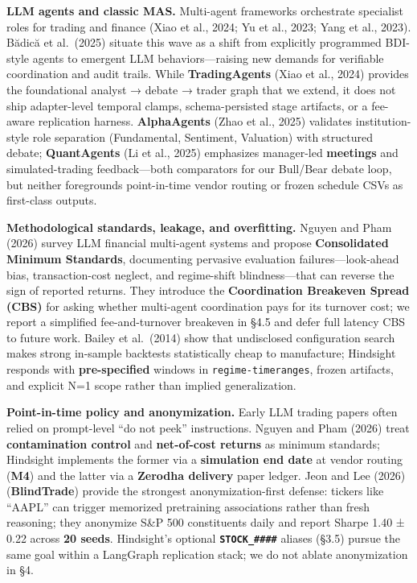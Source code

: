\documentclass[
]{article}
\begin{document}
\textbf{LLM agents and classic MAS.} Multi-agent frameworks orchestrate
specialist roles for trading and finance (Xiao et al., 2024; Yu et al.,
2023; Yang et al., 2023). Bădică et al.~(2025) situate this wave as a
shift from explicitly programmed BDI-style agents to emergent LLM
behaviors---raising new demands for verifiable coordination and audit
trails. While \textbf{TradingAgents} (Xiao et al., 2024) provides the
foundational analyst → debate → trader graph that we extend, it does not
ship adapter-level temporal clamps, schema-persisted stage artifacts, or
a fee-aware replication harness. \textbf{AlphaAgents} (Zhao et al.,
2025) validates institution-style role separation (Fundamental,
Sentiment, Valuation) with structured debate; \textbf{QuantAgents} (Li
et al., 2025) emphasizes manager-led \textbf{meetings} and
simulated-trading feedback---both comparators for our Bull/Bear debate
loop, but neither foregrounds point-in-time vendor routing or frozen
schedule CSVs as first-class outputs.

\textbf{Methodological standards, leakage, and overfitting.} Nguyen and
Pham (2026) survey LLM financial multi-agent systems and propose
\textbf{Consolidated Minimum Standards}, documenting pervasive
evaluation failures---look-ahead bias, transaction-cost neglect, and
regime-shift blindness---that can reverse the sign of reported returns.
They introduce the \textbf{Coordination Breakeven Spread (CBS)} for
asking whether multi-agent coordination pays for its turnover cost; we
report a simplified fee-and-turnover breakeven in §4.5 and defer full
latency CBS to future work. Bailey et al.~(2014) show that undisclosed
configuration search makes strong in-sample backtests statistically
cheap to manufacture; Hindsight responds with \textbf{pre-specified}
windows in \texttt{regime-timeranges}, frozen artifacts, and explicit
N=1 scope rather than implied generalization.

\textbf{Point-in-time policy and anonymization.} Early LLM trading
papers often relied on prompt-level ``do not peek'' instructions. Nguyen
and Pham (2026) treat \textbf{contamination control} and
\textbf{net-of-cost returns} as minimum standards; Hindsight implements
the former via a \textbf{simulation end date} at vendor routing
(\textbf{M4}) and the latter via a \textbf{Zerodha delivery} paper
ledger. Jeon and Lee (2026) (\textbf{BlindTrade}) provide the strongest
anonymization-first defense: tickers like ``AAPL'' can trigger memorized
pretraining associations rather than fresh reasoning; they anonymize
S\&P 500 constituents daily and report Sharpe 1.40 ± 0.22 across
\textbf{20 seeds}. Hindsight's optional
\textbf{\texttt{STOCK\_\#\#\#\#}} aliases (§3.5) pursue the same goal
within a LangGraph replication stack; we do not ablate anonymization in
§4.
\end{document}
